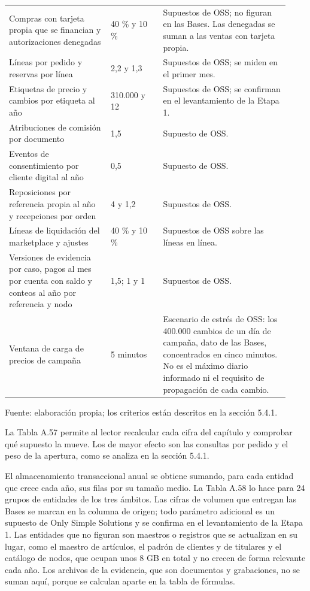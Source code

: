 \documentclass[11pt]{article}
\begin{document}
\begin{longtable}{@{}p{0.331\linewidth}p{0.176\linewidth}p{0.419\linewidth}@{}}
Compras con tarjeta propia que se financian y autorizaciones denegadas & 40 \% y 10 \% & Supuestos de OSS; no figuran en las Bases. Las denegadas se suman a las ventas con tarjeta propia. \\
Líneas por pedido y reservas por línea & 2,2 y 1,3 & Supuestos de OSS; se miden en el primer mes. \\
Etiquetas de precio y cambios por etiqueta al año & 310.000 y 12 & Supuestos de OSS; se confirman en el levantamiento de la Etapa 1. \\
Atribuciones de comisión por documento & 1,5 & Supuesto de OSS. \\
Eventos de consentimiento por cliente digital al año & 0,5 & Supuesto de OSS. \\
Reposiciones por referencia propia al año y recepciones por orden & 4 y 1,2 & Supuestos de OSS. \\
Líneas de liquidación del marketplace y ajustes & 40 \% y 10 \% & Supuestos de OSS sobre las líneas en línea. \\
Versiones de evidencia por caso, pagos al mes por cuenta con saldo y conteos al año por referencia y nodo & 1,5; 1 y 1 & Supuestos de OSS. \\
Ventana de carga de precios de campaña & 5 minutos & Escenario de estrés de OSS: los 400.000 cambios de un día de campaña, dato de las Bases, concentrados en cinco minutos. No es el máximo diario informado ni el requisito de propagación de cada cambio. \\
\end{longtable}

{\raggedright Fuente: elaboración propia; los criterios están descritos en la sección 5.4.1.\par}


La Tabla A.57 permite al lector recalcular cada cifra del capítulo y comprobar qué supuesto la mueve. Los de mayor efecto son las consultas por pedido y el peso de la apertura, como se analiza en la sección 5.4.1.

El almacenamiento transaccional anual se obtiene sumando, para cada entidad que crece cada año, sus filas por su tamaño medio. La Tabla A.58 lo hace para 24 grupos de entidades de los tres ámbitos. Las cifras de volumen que entregan las Bases se marcan en la columna de origen; todo parámetro adicional es un supuesto de Only Simple Solutions y se confirma en el levantamiento de la Etapa 1. Las entidades que no figuran son maestros o registros que se actualizan en su lugar, como el maestro de artículos, el padrón de clientes y de titulares y el catálogo de nodos, que ocupan unos 8 GB en total y no crecen de forma relevante cada año. Los archivos de la evidencia, que son documentos y grabaciones, no se suman aquí, porque se calculan aparte en la tabla de fórmulas.
\end{document}

